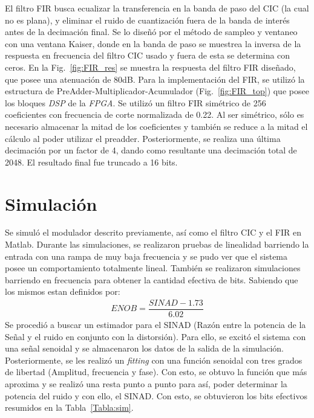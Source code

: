 \documentclass[a4paper,conference]{IEEEtran}
\begin{document}
El filtro FIR busca ecualizar la transferencia en la banda de paso del CIC (la cual no es plana), y eliminar el ruido de cuantizaci\'on fuera de la banda de interés antes de la 
decimaci\'on final. Se lo dise\~n\'o por el m\'etodo de sampleo y ventaneo con una ventana Kaiser, donde en la banda de paso se muestrea la inversa de la respuesta en frecuencia del filtro CIC usado y fuera de esta se determina con ceros\cite{FIR_Comp}. En la Fig.~\ref{fig:FIR_res} se muestra la respuesta del filtro FIR diseñado, que posee una atenuaci\'on de 80dB.
Para la implementación del FIR, se utiliz\'o la estructura de PreAdder-Multiplicador-Acumulador (Fig.~\ref{fig:FIR_top}) que posee los bloques \textit{DSP} de la \textit{FPGA}\cite{Sp6-DSP}. Se utiliz\'o un filtro FIR sim\'etrico de 256 coeficientes  con frecuencia de corte normalizada de 0.22. Al ser sim\'etrico, s\'olo es necesario almacenar la mitad de los coeficientes y tambi\'en se reduce a la mitad el c\'alculo al poder utilizar el preadder.  Posteriormente, se realiza una \'ultima decimaci\'on por un factor de 4, dando como resultante una decimaci\'on total de 2048. El resultado final fue truncado a 16 bits.




\section{Simulaci\'on}
Se simul\'o el modulador descrito previamente, as\'i como el filtro CIC y el FIR en Matlab\textregistered.
Durante las simulaciones, se realizaron pruebas de linealidad barriendo la entrada con una rampa de muy baja frecuencia y se pudo ver que el sistema posee un comportamiento totalmente lineal.
Tambi\'en se realizaron simulaciones barriendo en frecuencia para obtener la cantidad efectiva de bits. Sabiendo que los mismos estan definidos por: 
\begin{align}
ENOB = \dfrac{SINAD-1.73}{6.02}
\end{align}
Se procedió a buscar un estimador para el SINAD (Razón entre la potencia de la Se\~nal y el ruido en conjunto con la distorsi\'on). Para ello, se excitó el sistema con una señal senoidal y se almacenaron los datos de la salida de la simulación. Posteriormente, se les realizó un \textit{fitting} con una función senoidal con tres grados de libertad (Amplitud, frecuencia y fase). Con esto, se obtuvo la función que más aproxima y se realizó una resta punto a punto para así, poder determinar la potencia del ruido y con ello, el SINAD. Con esto, se obtuvieron los bits efectivos resumidos en la Tabla~\ref{Tabla:sim}.
\end{document}
